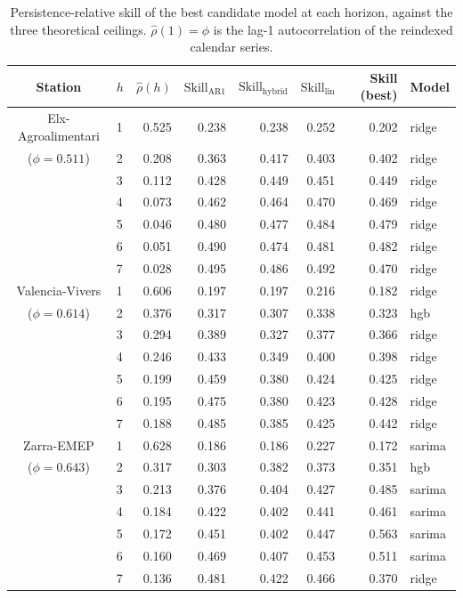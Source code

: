 \documentclass{article}
\begin{document}
\begin{table}[t]
\centering
\small
\setlength{\tabcolsep}{4pt}
\caption{Persistence-relative skill of the best candidate model at each
  horizon, against the three theoretical ceilings. $\hat\rho(1)=\phi$ is the
  lag-1 autocorrelation of the reindexed calendar series.}
\label{tab:main_results}
\begin{tabular}{@{}clrrrrrl@{}}
\toprule
Station & $h$ & $\hat\rho(h)$ & $\mathrm{Skill}_{\mathrm{AR1}}$ &
  $\mathrm{Skill}_{\mathrm{hybrid}}$ & $\mathrm{Skill}_{\mathrm{lin}}$ &
  Skill (best) & Model \\
\midrule
Elx-Agroalimentari & 1 & 0.525 & 0.238 & 0.238 & 0.252 & 0.202 & ridge \\
($\phi=0.511$)     & 2 & 0.208 & 0.363 & 0.417 & 0.403 & 0.402 & ridge \\
                    & 3 & 0.112 & 0.428 & 0.449 & 0.451 & 0.449 & ridge \\
                    & 4 & 0.073 & 0.462 & 0.464 & 0.470 & 0.469 & ridge \\
                    & 5 & 0.046 & 0.480 & 0.477 & 0.484 & 0.479 & ridge \\
                    & 6 & 0.051 & 0.490 & 0.474 & 0.481 & 0.482 & ridge \\
                    & 7 & 0.028 & 0.495 & 0.486 & 0.492 & 0.470 & ridge \\
\addlinespace
Valencia-Vivers     & 1 & 0.606 & 0.197 & 0.197 & 0.216 & 0.182 & ridge \\
($\phi=0.614$)      & 2 & 0.376 & 0.317 & 0.307 & 0.338 & 0.323 & hgb \\
                    & 3 & 0.294 & 0.389 & 0.327 & 0.377 & 0.366 & ridge \\
                    & 4 & 0.246 & 0.433 & 0.349 & 0.400 & 0.398 & ridge \\
                    & 5 & 0.199 & 0.459 & 0.380 & 0.424 & 0.425 & ridge \\
                    & 6 & 0.195 & 0.475 & 0.380 & 0.423 & 0.428 & ridge \\
                    & 7 & 0.188 & 0.485 & 0.385 & 0.425 & 0.442 & ridge \\
\addlinespace
Zarra-EMEP          & 1 & 0.628 & 0.186 & 0.186 & 0.227 & 0.172 & sarima \\
($\phi=0.643$)      & 2 & 0.317 & 0.303 & 0.382 & 0.373 & 0.351 & hgb \\
                    & 3 & 0.213 & 0.376 & 0.404 & 0.427 & 0.485 & sarima \\
                    & 4 & 0.184 & 0.422 & 0.402 & 0.441 & 0.461 & sarima \\
                    & 5 & 0.172 & 0.451 & 0.402 & 0.447 & 0.563 & sarima \\
                    & 6 & 0.160 & 0.469 & 0.407 & 0.453 & 0.511 & sarima \\
                    & 7 & 0.136 & 0.481 & 0.422 & 0.466 & 0.370 & ridge \\
\bottomrule
\end{tabular}
\end{table}
\end{document}
